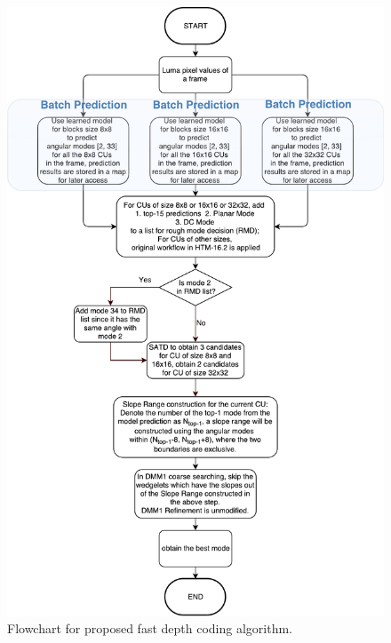 \begin{figure}
    \centering
    \includegraphics[height=0.92\textheight,keepaspectratio]{Figures/proposed-fast-depth-coding-algorithm}
    \caption[Flowchart for proposed fast depth coding 
    algorithm]{Flowchart for proposed fast depth coding 
    algorithm.}\label{fig:proposed-fast-depth-coding-algorithm}
\end{figure}

